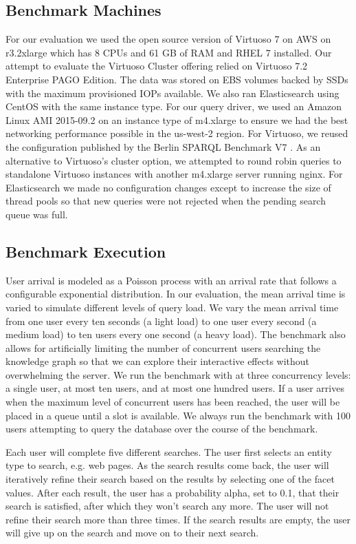 \subsection{Benchmark Machines}
For our evaluation we used the open source version of Virtuoso 7 on AWS on r3.2xlarge which has 8 CPUs and 61 GB of RAM and RHEL 7 installed.  
Our attempt to evaluate the Virtuoso Cluster offering relied on Virtuoso 7.2 Enterprise PAGO Edition\cite{virtuosopago}.
The data was stored on EBS volumes backed by SSDs with the maximum provisioned IOPs available. 
We also ran Elasticsearch using CentOS with the same instance type.  
For our query driver, we used an Amazon Linux AMI 2015-09.2 on an instance type of m4.xlarge to ensure we had the best networking performance possible in the us-west-2 region.    
For Virtuoso, we reused the configuration published by the Berlin SPARQL Benchmark V7 \cite{bsbmv7}.
As an alternative to Virtuoso's cluster option, we attempted to round robin queries to standalone Virtuoso instances with another m4.xlarge server running nginx.
For Elasticsearch we made no configuration changes except to increase the size of thread pools so that new queries were not rejected when the pending search queue was full. 

\subsection{Benchmark Execution}
User arrival is modeled as a Poisson process with an arrival rate that follows a configurable exponential distribution.  
In our evaluation, the mean arrival time is varied to simulate different levels of query load.  
We vary the mean arrival time from one user every ten seconds (a light load) to one user every second (a medium load) to ten users every one second (a heavy load).
The benchmark also allows for artificially limiting the number of concurrent users searching the knowledge graph so that we can explore their interactive effects without overwhelming the server.  
We run the benchmark with at three concurrency levels: a single user, at most ten users, and at most one hundred users.
If a user arrives when the maximum level of concurrent users has been reached, the user will be placed in a queue until a slot is available.  
We always run the benchmark with 100 users attempting to query the database over the course of the benchmark.

Each user will complete five different searches. 
The user first selects an entity type to search, e.g. web pages.
As the search results come back, the user will iteratively refine their search based on the results by selecting one of the facet values.
After each result, the user has a probability alpha, set to 0.1, that their search is satisfied, after which they won't search any more.
The user will not refine their search more than three times.
If the search results are empty, the user will give up on the search and move on to their next search.


